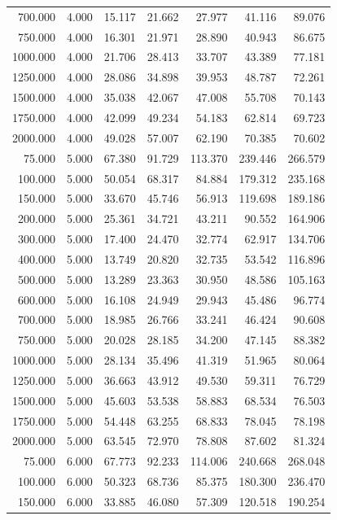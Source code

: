 {\begin{longtable}{rrrrrrr}
700.000 & 4.000 & 15.117 & 21.662 & 27.977 & 41.116 & 89.076 \\
750.000 & 4.000 & 16.301 & 21.971 & 28.890 & 40.943 & 86.675 \\
1000.000 & 4.000 & 21.706 & 28.413 & 33.707 & 43.389 & 77.181 \\
1250.000 & 4.000 & 28.086 & 34.898 & 39.953 & 48.787 & 72.261 \\
1500.000 & 4.000 & 35.038 & 42.067 & 47.008 & 55.708 & 70.143 \\
1750.000 & 4.000 & 42.099 & 49.234 & 54.183 & 62.814 & 69.723 \\
2000.000 & 4.000 & 49.028 & 57.007 & 62.190 & 70.385 & 70.602 \\
75.000 & 5.000 & 67.380 & 91.729 & 113.370 & 239.446 & 266.579 \\
100.000 & 5.000 & 50.054 & 68.317 & 84.884 & 179.312 & 235.168 \\
150.000 & 5.000 & 33.670 & 45.746 & 56.913 & 119.698 & 189.186 \\
200.000 & 5.000 & 25.361 & 34.721 & 43.211 & 90.552 & 164.906 \\
300.000 & 5.000 & 17.400 & 24.470 & 32.774 & 62.917 & 134.706 \\
400.000 & 5.000 & 13.749 & 20.820 & 32.735 & 53.542 & 116.896 \\
500.000 & 5.000 & 13.289 & 23.363 & 30.950 & 48.586 & 105.163 \\
600.000 & 5.000 & 16.108 & 24.949 & 29.943 & 45.486 & 96.774 \\
700.000 & 5.000 & 18.985 & 26.766 & 33.241 & 46.424 & 90.608 \\
750.000 & 5.000 & 20.028 & 28.185 & 34.200 & 47.145 & 88.382 \\
1000.000 & 5.000 & 28.134 & 35.496 & 41.319 & 51.965 & 80.064 \\
1250.000 & 5.000 & 36.663 & 43.912 & 49.530 & 59.311 & 76.729 \\
1500.000 & 5.000 & 45.603 & 53.538 & 58.883 & 68.534 & 76.503 \\
1750.000 & 5.000 & 54.448 & 63.255 & 68.833 & 78.045 & 78.198 \\
2000.000 & 5.000 & 63.545 & 72.970 & 78.808 & 87.602 & 81.324 \\
75.000 & 6.000 & 67.773 & 92.233 & 114.006 & 240.668 & 268.048 \\
100.000 & 6.000 & 50.323 & 68.736 & 85.375 & 180.300 & 236.470 \\
150.000 & 6.000 & 33.885 & 46.080 & 57.309 & 120.518 & 190.254 \\

\end{longtable}}
